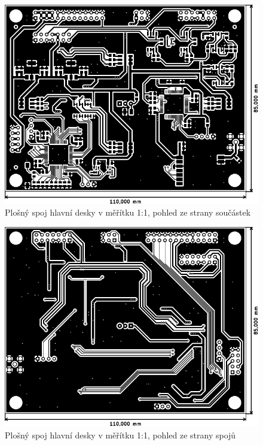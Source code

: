 \begin{figure}[h]
    \centering
    \includegraphics{pcb/main-top}
    \caption{Plošný spoj hlavní desky v měřítku 1:1, pohled ze strany součástek}
\end{figure}
\begin{figure}[h]
    \centering
    \includegraphics{pcb/main-bot}
    \caption{Plošný spoj hlavní desky v měřítku 1:1, pohled ze strany spojů}
\end{figure}

